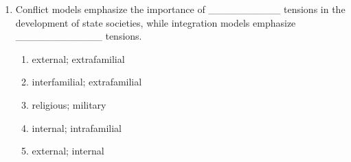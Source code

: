 \documentclass[12pt]{article}
\begin{document}
\begin{enumerate}[label=\arabic*.]
\begin{enumerate}[label=(\alph*)]
    \item legal and judicial systems.
    \item political and military history.
\end{enumerate}
\item Conflict models emphasize the importance of \_\_\_\_\_\_\_\_\_\_ tensions in the development of state societies, while integration models emphasize \_\_\_\_\_\_\_\_\_\_\_\_ tensions.
\begin{enumerate}[label=(\alph*)]
    \item external; extrafamilial
    \item interfamilial; extrafamilial
    \item religious; military
    \item internal; intrafamilial
    \item external; internal
\end{enumerate}
\end{enumerate}
\end{document}
